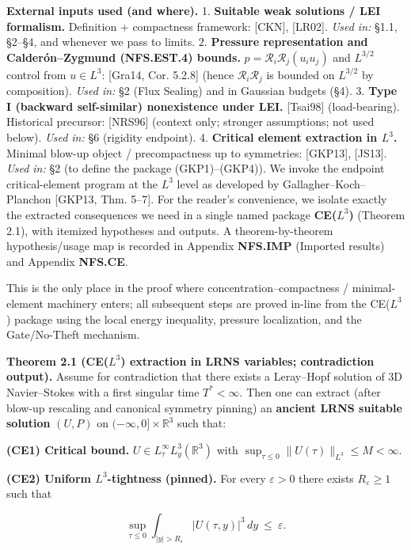 \documentclass[
  11pt,
]{article}
\begin{document}
\textbf{External inputs used (and where).} 1. \textbf{Suitable weak solutions / LEI formalism.} Definition + compactness framework: {[}CKN{]}, {[}LR02{]}. \emph{Used in:} §1.1, §2--§4, and whenever we pass to limits. 2. \textbf{Pressure representation and Calderón--Zygmund (NFS.EST.4) bounds.} \(p = \mathcal R_i\mathcal R_j(u_i u_j)\) and \(L^{3/2}\) control from \(u\in L^3\): {[}Gra14, Cor. 5.2.8{]} (hence \(\mathcal R_i\mathcal R_j\) is bounded on \(L^{3/2}\) by composition). \emph{Used in:} §2 (Flux Sealing) and in Gaussian budgets (§4). 3. \textbf{Type I (backward self-similar) nonexistence under LEI.} {[}Tsai98{]} (load-bearing). Historical precursor: {[}NRS96{]} (context only; stronger assumptions; not used below). \emph{Used in:} §6 (rigidity endpoint). 4. \textbf{Critical element extraction in \(L^3\).} Minimal blow-up object / precompactness up to symmetries: {[}GKP13{]}, {[}JS13{]}. \emph{Used in:} §2 (to define the package (GKP1)--(GKP4)). We invoke the endpoint critical-element program at the \(L^3\) level as developed by Gallagher--Koch--Planchon {[}GKP13, Thm. 5--7{]}. For the reader's convenience, we isolate exactly the extracted consequences we need in a single named package \textbf{CE(\(L^3\))} (Theorem 2.1), with itemized hypotheses and outputs. A theorem-by-theorem hypothesis/usage map is recorded in Appendix \textbf{NFS.IMP} (Imported results) and Appendix \textbf{NFS.CE}.

This is the only place in the proof where concentration--compactness / minimal-element machinery enters; all subsequent steps are proved in-line from the CE(\(L^3\)) package using the local energy inequality, pressure localization, and the Gate/No-Theft mechanism.

\textbf{Theorem 2.1 (CE(\(L^3\)) extraction in LRNS variables; contradiction output).} Assume for contradiction that there exists a Leray--Hopf solution of 3D Navier--Stokes with a first singular time \(T^*<\infty\). Then one can extract (after blow-up rescaling and canonical symmetry pinning) an \textbf{ancient LRNS suitable solution} \((U,P)\) on \((-\infty,0]\times\mathbb R^3\) such that:

\textbf{(CE1) Critical bound.} \(U\in L^\infty_\tau L^3_y(\mathbb R^3)\) with \(\sup_{\tau\le 0}\|U(\tau)\|_{L^3}\le M<\infty\).

\textbf{(CE2) Uniform \(L^3\)-tightness (pinned).} For every \(\varepsilon>0\) there exists \(R_\varepsilon\ge 1\) such that

\begin{equation}
\sup_{\tau\le 0}\int_{|y|>R_\varepsilon}|U(\tau,y)|^3\,dy\ \le\ \varepsilon.
\tag{CE2}\label{CE2_tightness}
\end{equation}
\end{document}
